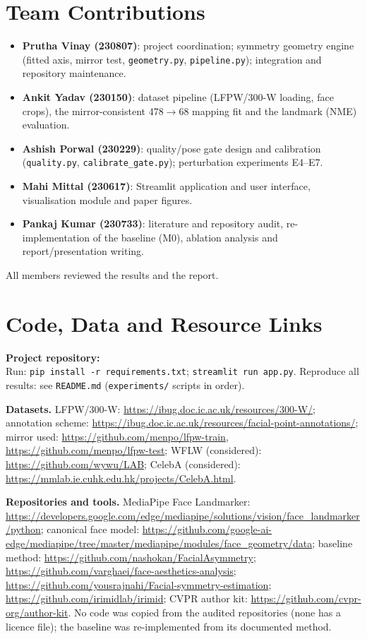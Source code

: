 \section{Team Contributions}
\label{sec:contrib}
\begin{itemize}[leftmargin=*,itemsep=2pt,topsep=2pt]
\item \textbf{Prutha Vinay (230807)}: project coordination; symmetry geometry engine
(fitted axis, mirror test, \texttt{geometry.py}, \texttt{pipeline.py}); integration and
repository maintenance.
\item \textbf{Ankit Yadav (230150)}: dataset pipeline (LFPW/300-W loading, face crops), the
mirror-consistent 478$\to$68 mapping fit and the landmark (NME) evaluation.
\item \textbf{Ashish Porwal (230229)}: quality/pose gate design and calibration
(\texttt{quality.py}, \texttt{calibrate\_gate.py}); perturbation experiments E4--E7.
\item \textbf{Mahi Mittal (230617)}: Streamlit application and user interface,
visualisation module and paper figures.
\item \textbf{Pankaj Kumar (230733)}: literature and repository audit, re-implementation
of the baseline (M0), ablation analysis and report/presentation writing.
\end{itemize}
All members reviewed the results and the report.

\section{Code, Data and Resource Links}
\textbf{Project repository:} \repo\\
Run: \texttt{pip install -r requirements.txt}; \texttt{streamlit run app.py}.
Reproduce all results: see \texttt{README.md} (\texttt{experiments/} scripts in order).

\noindent\textbf{Datasets.}
LFPW/300-W: \url{https://ibug.doc.ic.ac.uk/resources/300-W/};
annotation scheme: \url{https://ibug.doc.ic.ac.uk/resources/facial-point-annotations/};
mirror used: \url{https://github.com/menpo/lfpw-train}, \url{https://github.com/menpo/lfpw-test};
WFLW (considered): \url{https://github.com/wywu/LAB};
CelebA (considered): \url{https://mmlab.ie.cuhk.edu.hk/projects/CelebA.html}.

\noindent\textbf{Repositories and tools.}
MediaPipe Face Landmarker: \url{https://developers.google.com/edge/mediapipe/solutions/vision/face_landmarker/python};
canonical face model: \url{https://github.com/google-ai-edge/mediapipe/tree/master/mediapipe/modules/face_geometry/data};
baseline method: \url{https://github.com/nashokan/FacialAsymmetry};
\url{https://github.com/varghaei/face-aesthetics-analysis};
\url{https://github.com/yousrajnahi/Facial-symmetry-estimation};
\url{https://github.com/irimidlab/irimid};
CVPR author kit: \url{https://github.com/cvpr-org/author-kit}.
No code was copied from the audited repositories (none has a licence file); the baseline
was re-implemented from its documented method.

